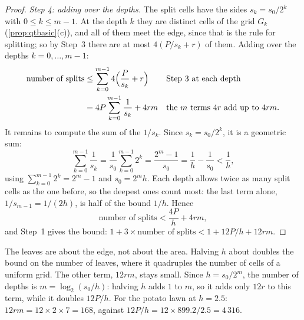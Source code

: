 \begin{proof}
\emph{Step 4: adding over the depths.} The split cells have the sides $s_k=s_0/2^k$ with $0\le k\le m-1$. At
the depth $k$ they are distinct cells of the grid $G_k$
(\cref{prop:qtbasic}(c)), and all of them meet the edge, since that is
the rule for splitting; so by Step~3 there are at most $4(P/s_k+r)$ of
them. Adding over the depths $k=0,\dots,m-1$:
\begin{align*}
  \text{number of splits}
  &\le\sum_{k=0}^{m-1}4\Bigl(\frac P{s_k}+r\Bigr)
  &&\text{Step 3 at each depth}\\
  &=4P\sum_{k=0}^{m-1}\frac1{s_k}+4rm
  &&\text{the $m$ terms $4r$ add up to $4rm$.}
\end{align*}
It remains to compute the sum of the $1/s_k$. Since $s_k=s_0/2^k$, it is
a geometric sum:
\[
  \sum_{k=0}^{m-1}\frac1{s_k}=\frac1{s_0}\sum_{k=0}^{m-1}2^k
  =\frac{2^m-1}{s_0}=\frac1h-\frac1{s_0}<\frac1h ,
\]
using $\sum_{k=0}^{m-1}2^k=2^m-1$ and $s_0=2^mh$. Each depth allows twice as many split cells as the one before, so the
deepest ones count most: the last term alone, $1/s_{m-1}=1/(2h)$, is half
of the bound $1/h$. Hence
\[
  \text{number of splits}<\frac{4P}h+4rm ,
\]
and Step~1 gives the bound:
$1+3\times\text{number of splits}<1+12P/h+12rm$.
\end{proof}

\begin{inwords}
The leaves are about the edge, not about the area. Halving $h$ about
doubles the bound on the number of leaves, where it quadruples the number
of cells of a uniform grid. The other term, $12rm$, stays small. Since $h=s_0/2^m$, the number of
depths is $m=\log_2(s_0/h)$: halving $h$ adds $1$ to $m$, so it adds only
$12r$ to this term, while it doubles $12P/h$. For the potato lawn at
$h=2.5$: $12rm=12\times2\times7=168$, against
$12P/h=12\times899.2/2.5=4\,316$.
\end{inwords}

